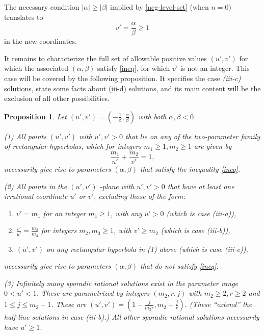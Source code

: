 \documentclass[12pt,letterpaper, reqno]{amsart}
\newtheorem{prop}[thm]{Proposition}
\theoremstyle{definition}
\theoremstyle{remark}
\newcommand{\uu}{{u'}}
\newcommand{\vv}{{v'}}
\begin{document}
The  necessary condition $|\alpha|\geq |\beta|$ implied by \eqref{neg-level-set} (when $n=0$) translates to
\begin{equation}\label{necessary}
 \vv= \frac{\alpha}{\beta} \geq 1
\end{equation}
in the new coordinates.

It remains to characterize the full  set of allowable  positive values $(\uu, \vv)$
for which the associated $(\alpha, \beta)$ satisfy \eqref{ineq}, for which $\vv$ is not an integer.
This case will be covered by the following proposition. It specifies the case {\em (iii-c)}  solutions,
state some facts about (iii-d) solutions, and its main content will be the exclusion of all other possibilities. 
 





%
%
\begin{prop}\label{prop:32} {} 
Let $(\uu, \vv) = (-\frac{1}{\beta}, \frac{\alpha}{\beta})$ with both $\alpha, \beta <0$.

(1)  All points $(\uu, \vv)$ with $\uu, \vv >0$ that lie on any of  the two-parameter family of rectangular hyperbolas,
which for  integers $m_1 \ge 1, m_2 \ge 1$ are given by
$$\frac{m_1}{\uu} + \frac{m_2}{\vv} =1,$$
necessarily  give rise to  parameters $(\alpha, \beta)$
that satisfy  the inequality \eqref{ineq}.

(2) All points in the $(\uu, \vv)$ -plane with $\uu, \vv>0$ that
have at least one irrational coordinate $\uu$ or $\vv$,
excluding those of the form: 
\begin{enumerate}
\item[(a)]
$\vv = {m_1}$ for an integer $m_1 \ge 1$, with any  $\uu >0$
(which is  case {\it (iii-a)}),
\item[(b)]
 $\frac{\vv}{\uu} = \frac{m_2}{m_3}$ for integers $m_2, m_3 \ge 1$, with $\vv \geq {m_2}$
 (which is  case {\it (iii-b)}),
\item[(c)] $(\uu, \vv)$  on any rectangular hyperbola in (1) above 
(which is  case {\it (iii-c)}),
\end{enumerate}
necessarily give rise to  parameters $(\alpha, \beta)$ that do not satisfy  \eqref{ineq}.

(3) Infinitely many sporadic rational solutions exist in the parameter range $0< {\uu} <1$. 
These are parametrized by integers $(m_2, r, j)$ with $m_2 \ge 2, r\ge 2$ and $1 \le j \le m_2-1$.
These are $(\uu, \vv)=( 1-\frac{j}{m_2r}, m_2 - \frac{j}{r})$.
(These ``extend'' the half-line solutions in case (iii-b).)
All other sporadic rational solutions necessarily  have ${\uu} \ge 1$.
\end{prop}
\end{document}
